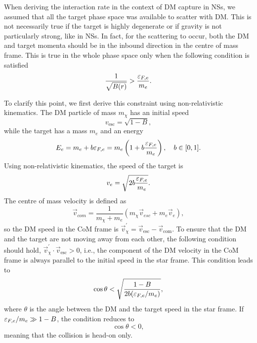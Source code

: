 When deriving the interaction rate in the context of DM capture in NSs, we assumed that all the target phase space was available to scatter with DM. This is not necessarily true if the target is highly degenerate or if gravity is not particularly strong, like in NSs. In fact, for the scattering to occur, both the DM and target momenta should be in the inbound direction in the centre of mass frame. This is true in the whole phase space only when the 
following condition is satisfied 
\begin{equation}
\frac{1}{\sqrt{B(r)}}>\frac{\varepsilon_{F,e}}{m_e}.
\end{equation}

To clarify this point, we first derive this constraint using non-relativistic kinematics.
The DM particle of mass $m_\chi$ has an initial speed
\begin{equation}
    v_\mathrm{esc}=\sqrt{1-B}, 
\end{equation}
while the target has a mass $m_e$ and an energy
\begin{equation}
    E_e= m_e+b\varepsilon_{F,e}=m_e\left(1+b \frac{\varepsilon_{F,e}}{m_e}\right),\quad b\in[0,1].
\end{equation}
Using non-relativistic kinematics, the speed of the target is 
\begin{equation}
    v_e=\sqrt{2b\frac{\varepsilon_{F,e}}{m_e}}.
\end{equation} 
The centre of mass velocity is defined as
\begin{equation}
\vec{v}_{com} = \frac{1}{m_\chi+m_e} (m_\chi \vec{v}_{esc}+m_e \vec{v}_e), 
\end{equation}
so the DM speed in the CoM frame is $ \vec{v}_\chi^{'} = \vec{v}_\mathrm{esc}-\vec{v}_\mathrm{com}$. 
To ensure that the DM and the target are not moving away from each other, the following condition should hold, $\vec{v}_\chi^{'}\cdot \vec{v}_\mathrm{esc} >0$, 
i.e., the component of the DM velocity in the CoM frame is always parallel to the initial speed in the star frame. 
This condition leads to
\begin{equation}
    \cos\theta < \sqrt{\frac{1-B}{2b (\varepsilon_{F,e}/m_e)}}, \label{app:eq:condnonrel}
\end{equation}
where $\theta$ is the angle between the DM and the target speed in the star frame. If $\varepsilon_{F,e}/m_e\gg1-B$, the condition reduces to 
\begin{equation}
    \cos\theta<0, 
\end{equation}
meaning that the collision is head-on only. 

